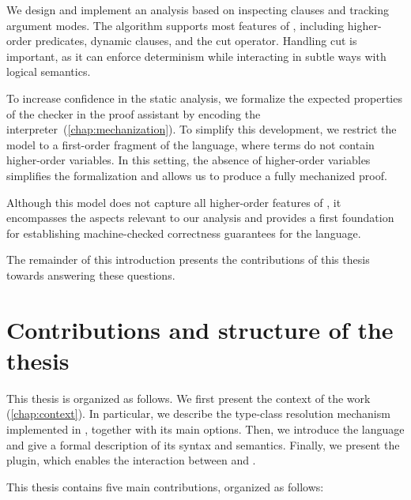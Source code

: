 We design and implement an analysis based on inspecting clauses and tracking
argument modes. The algorithm supports most features of \elpi, including
higher-order predicates, dynamic clauses, and the cut operator. Handling cut is
important, as it can enforce determinism while interacting in subtle ways with
logical semantics.

To increase confidence in the static analysis, we formalize the expected
properties of the checker in the \rocq proof assistant by encoding the \elpi
interpreter~(\cref{chap:mechanization}). To simplify this development, we restrict
the model to a first-order fragment of the language, where terms do not contain
higher-order variables. In this setting, the absence of higher-order variables
simplifies the formalization and allows us to produce a fully mechanized proof.

Although this model does not capture all higher-order features of \elpi, it
encompasses the aspects relevant to our analysis and provides a first foundation
for establishing machine-checked correctness guarantees for the \elpi language.

The remainder of this introduction presents the contributions of this thesis
towards answering these questions.


\section{Contributions and structure of the thesis}

This thesis is organized as follows. We first present the
context of the work (\cref{chap:context}). In particular, we describe the
type-class resolution mechanism implemented in \rocq, together with its main
options. Then, we introduce the \elpi language and give a formal description of
its syntax and semantics. Finally, we present the \rocqelpi plugin, which enables
the interaction between \elpi and \rocq.

This thesis contains five main contributions, organized as follows:

